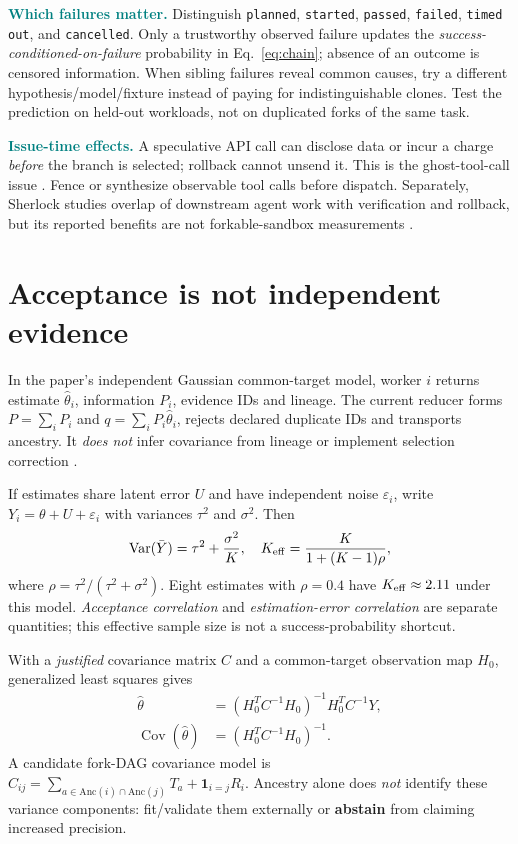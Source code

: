 \documentclass[10pt,twocolumn]{article}
\newcommand{\Claim}[1]{\noindent\textcolor{teal}{\textbf{#1}}\;}
\newcommand{\1}{\mathbf{1}}
\begin{document}
\Claim{Which failures matter.} Distinguish \texttt{planned}, \texttt{started}, \texttt{passed}, \texttt{failed}, \texttt{timed out}, and \texttt{cancelled}. Only a trustworthy observed failure updates the \emph{success-conditioned-on-failure} probability in Eq.~\eqref{eq:chain}; absence of an outcome is censored information. When sibling failures reveal common causes, try a different hypothesis/model/fixture instead of paying for indistinguishable clones. Test the prediction on held-out workloads, not on duplicated forks of the same task.

\Claim{Issue-time effects.} A speculative API call can disclose data or incur a charge \emph{before} the branch is selected; rollback cannot unsend it. This is the ghost-tool-call issue \cite{ghost}. Fence or synthesize observable tool calls before dispatch. Separately, Sherlock studies overlap of downstream agent work with verification and rollback, but its reported benefits are not forkable-sandbox measurements \cite{sherlock}.

\section{Acceptance is not independent evidence}

In the paper's independent Gaussian common-target model, worker $i$ returns estimate $\hat\theta_i$, information $P_i$, evidence IDs and lineage. The current reducer forms $P=\sum_iP_i$ and $q=\sum_i P_i\hat\theta_i$, rejects declared duplicate IDs and transports ancestry. It \emph{does not} infer covariance from lineage or implement selection correction \cite{eliazbmr}.

If estimates share latent error $U$ and have independent noise $\varepsilon_i$, write $Y_i=\theta+U+\varepsilon_i$ with variances $\tau^2$ and $\sigma^2$. Then
\begin{equation}
\operatorname{Var}(\bar Y)=\tau^2+\frac{\sigma^2}{K},\quad
K_{\rm eff}=\frac{K}{1+(K-1)\rho},
\end{equation}
where $\rho=\tau^2/(\tau^2+\sigma^2)$. Eight estimates with $\rho=0.4$ have $K_{\rm eff}\approx2.11$ under this model. \emph{Acceptance correlation} and \emph{estimation-error correlation} are separate quantities; this effective sample size is not a success-probability shortcut.

With a \emph{justified} covariance matrix $C$ and a common-target observation map $H_0$, generalized least squares gives
\begin{equation}
\label{eq:gls}
\begin{aligned}
\hat\theta&=(H_0^TC^{-1}H_0)^{-1}H_0^TC^{-1}Y,\\
\operatorname{Cov}(\hat\theta)&=(H_0^TC^{-1}H_0)^{-1}.
\end{aligned}
\end{equation}
A candidate fork-DAG covariance model is $C_{ij}=\sum_{a\in\mathrm{Anc}(i)\cap\mathrm{Anc}(j)}T_a+\1_{i=j}R_i$. Ancestry alone does \emph{not} identify these variance components: fit/validate them externally or \textbf{abstain} from claiming increased precision.
\end{document}
